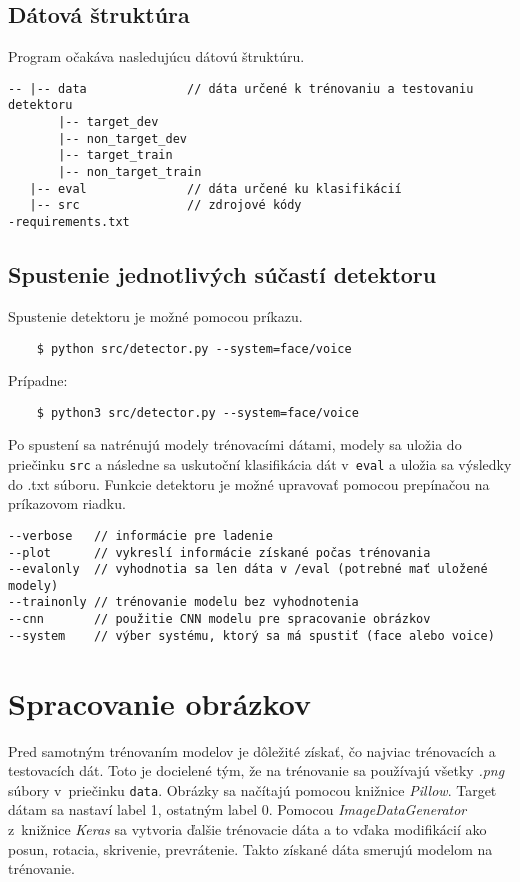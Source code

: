 \documentclass[11pt, a4paper]{article}
\begin{document}
		\subsection{Dátová štruktúra}
	Program očakáva nasledujúcu dátovú štruktúru.
			\begin{verbatim}
-- |-- data              // dáta určené k trénovaniu a testovaniu detektoru
       |-- target_dev
       |-- non_target_dev
       |-- target_train
       |-- non_target_train
   |-- eval              // dáta určené ku klasifikácií
   |-- src               // zdrojové kódy 
-requirements.txt
			\end{verbatim}
			
		\subsection{Spustenie jednotlivých súčastí detektoru}
	Spustenie detektoru je možné pomocou príkazu.
			\begin{verbatim}
    $ python src/detector.py --system=face/voice
			\end{verbatim}
	Prípadne:
			\begin{verbatim}
    $ python3 src/detector.py --system=face/voice
			\end{verbatim}
	Po spustení sa natrénujú modely trénovacími dátami, modely sa uložia do priečinku \texttt{src} a následne sa uskutoční klasifikácia dát v~\texttt{eval} a uložia sa výsledky do .txt súboru.
	Funkcie detektoru je možné upravovať pomocou prepínačou na príkazovom riadku.
			\begin{verbatim}
--verbose   // informácie pre ladenie
--plot      // vykreslí informácie získané počas trénovania 
--evalonly  // vyhodnotia sa len dáta v /eval (potrebné mať uložené modely)
--trainonly // trénovanie modelu bez vyhodnotenia
--cnn       // použitie CNN modelu pre spracovanie obrázkov
--system    // výber systému, ktorý sa má spustiť (face alebo voice)
			\end{verbatim}
			
	\section{Spracovanie obrázkov}
		Pred samotným trénovaním modelov je dôležité získať, čo najviac trénovacích a testovacích dát. Toto je docielené tým, že na trénovanie sa používajú všetky \emph{.png} súbory v~priečinku \texttt{data}. Obrázky sa načítajú pomocou knižnice \emph{Pillow}. Target dátam sa nastaví label 1, ostatným label 0. Pomocou \emph{ImageDataGenerator} z~knižnice \emph{Keras} sa vytvoria ďalšie trénovacie dáta a to vďaka modifikácií ako posun, rotacia, skrivenie, prevrátenie. Takto získané dáta smerujú modelom na trénovanie. 
		
\end{document}
